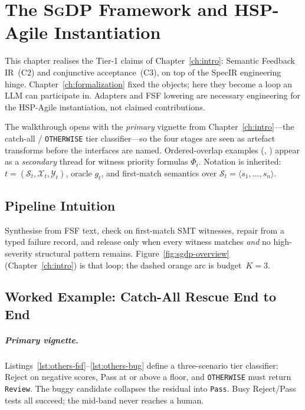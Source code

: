 
\chapter{The \textsc{SgDP} Framework and HSP-Agile Instantiation}
\label{ch:method}

This chapter realises the Tier-1 claims of Chapter~\ref{ch:intro}:
Semantic Feedback IR~(C2) and conjunctive acceptance~(C3), on top of the
SpecIR engineering hinge.
Chapter~\ref{ch:formalization} fixed the objects; here they become a loop an
LLM can participate in.
Adapters and FSF lowering are necessary engineering for the HSP-Agile
instantiation, not claimed contributions.

The walkthrough opens with the \emph{primary} vignette from
Chapter~\ref{ch:intro}---the catch-all / \texttt{OTHERWISE} tier classifier---so
the four stages are seen as artefact transforms before the interfaces are
named.
Ordered-overlap examples (, ) appear
as a \emph{secondary} thread for witness priority formulas $\Phi_i$.
Notation is inherited:
$t = (\mathcal{S}_t, \mathcal{X}_t, \mathcal{Y}_t)$, oracle $g_t$, and
first-match semantics over $\mathcal{S}_t = \langle s_1,\ldots,s_n\rangle$.

\section{Pipeline Intuition}
\label{sec:method:intuition}

Synthesise from FSF text, check on first-match SMT witnesses, repair from a
typed failure record, and release only when every witness matches \emph{and} no
high-severity structural pattern remains.
Figure~\ref{fig:sgdp-overview} (Chapter~\ref{ch:intro}) is that loop; the
dashed orange arc is budget~$K=3$.

\section{Worked Example: Catch-All Rescue End to End}
\label{sec:method:worked}

\paragraph{Primary vignette.}
Listings~\ref{lst:others-fsf}--\ref{lst:others-bug} define a three-scenario
tier classifier: Reject on negative scores, Pass at or above a floor, and
\texttt{OTHERWISE} must return \texttt{Review}.
The buggy candidate collapses the residual into \texttt{Pass}.
Busy Reject/Pass tests all succeed; the mid-band never reaches a human.

